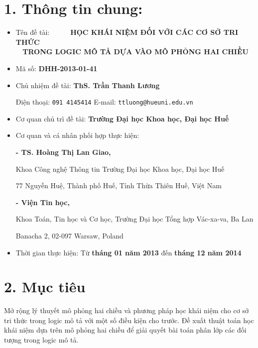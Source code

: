\section*{1. Thông tin chung:}
\begin{itemize}
	\item Tên đề tài:~~~~~~\textbf{HỌC KHÁI NIỆM ĐỐI VỚI CÁC CƠ SỞ TRI THỨC\\
	\mbox{~}\hspace{8ex} TRONG LOGIC MÔ TẢ DỰA VÀO MÔ PHỎNG HAI CHIỀU}\\[-0.8cm]
	\item Mã số: {\bf DHH-2013-01-41}\\[-0.8cm]
	\item Chủ nhiệm đề tài: {\bf ThS. Trần Thanh Lương}
	
	\vspace{-0.5ex}
	Điện thoại: \texttt{091 4145414} \qquad\qquad\qquad\qquad E-mail: \texttt{ttluong@hueuni.edu.vn}\\[-0.8cm]
	\item Cơ quan chủ trì đề tài: {\bf Trường Đại học Khoa học, Đại học Huế}\\[-0.8cm]
	\item Cơ quan và cá nhân phối hợp thực hiện:
	
	{\bf - TS. Hoàng Thị Lan Giao,}
	
	\vspace{-0.5ex}	
	Khoa Công nghệ Thông tin Trường Đại học Khoa học, Đại học Huế
	
	\vspace{-0.5ex}	
	77 Nguyễn Huệ, Thành phố Huế, Tỉnh Thừa Thiên Huế, Việt Nam
	
	{\bf - Viện Tin học,}
	
	\vspace{-0.5ex}	
	Khoa Toán, Tin học và Cơ học, Trường Đại học Tổng hợp Vác-xa-va, Ba Lan
	
	\vspace{-0.5ex}	
	Banacha 2, 02-097 Warsaw, Poland\\[-0.8cm]
	
	\item Thời gian thực hiện: Từ {\bf tháng 01 năm 2013} đến {\bf tháng 12 năm 2014}
\end{itemize}

\section*{2. Mục tiêu}
Mở rộng lý thuyết mô phỏng hai chiều và phương pháp học khái niệm cho cơ sở tri thức trong logic mô tả với một số điều kiện cho trước.
Đề xuất thuật toán học khái niệm dựa trên mô phỏng hai chiều để giải quyết bài toán phân lớp các đối tượng trong logic mô tả.

